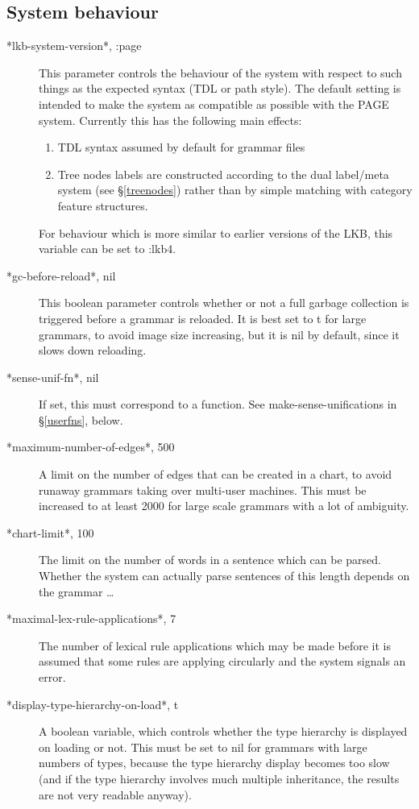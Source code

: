 \documentclass[12pt]{report}
\begin{document}
\subsection{System behaviour}
\label{sysbeh}
\begin{description}
\item[*lkb-system-version*, :page]
This parameter controls the behaviour of the system with respect to
such things as the expected syntax (TDL or path style).  The default
setting is intended to make the system as compatible as possible with
the PAGE system.  Currently this has the following main effects:
\begin{enumerate}
\item TDL syntax assumed by default for grammar files
\item Tree nodes labels are constructed according to the dual
label/meta system (see \S\ref{treenodes}) rather than by simple
matching with category feature structures.
\end{enumerate}
For behaviour which is more similar to earlier versions of the LKB,
this variable can be set to :lkb4.
\item[*gc-before-reload*, nil] This boolean parameter controls
whether or not 
a full garbage collection is triggered before a grammar is reloaded.
It is best set to t for large grammars, to avoid image size increasing,
but it is nil by default, since it slows down reloading.
\item[*sense-unif-fn*, nil]  If set, this must correspond to
a function.
See make-sense-unifications in \S\ref{userfns},
below.
\item[*maximum-number-of-edges*, 500] A limit on the number of edges that can
be created in a chart, to avoid runaway grammars taking over multi-user
machines.  This must be increased to at least 2000 for large scale grammars
with a lot of ambiguity.
\item[*chart-limit*, 100] The limit on the number of words in a sentence
which can be parsed.  Whether the system can actually parse sentences of
this length depends on the grammar \ldots
\item[*maximal-lex-rule-applications*, 7] 
The number of lexical rule applications which may be made
before it is assumed that some rules are applying circularly and the system
signals an error.
\item[*display-type-hierarchy-on-load*, t] A boolean variable, which
controls whether the type hierarchy is displayed on loading or not.
This must be set to nil for grammars with large numbers
of types, because the type hierarchy display becomes too slow (and if the
type hierarchy involves much multiple inheritance, the results are not
very readable anyway). 
\end{description}
\end{document}
